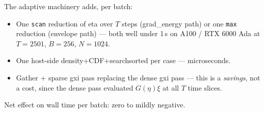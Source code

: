 \documentclass[11pt]{article}
\begin{document}
The adaptive machinery adds, per batch:

\begin{itemize}
  \item One \texttt{scan} reduction of eta over $T$ steps (grad\_energy path)
  or one \texttt{max} reduction (envelope path) --- both well under 1\,s on
  A100 / RTX 6000 Ada at $T = 2501$, $B = 256$, $N = 1024$.

  \item One host-side density+CDF+searchsorted per case --- microseconds.

  \item Gather + sparse gxi pass replacing the dense gxi pass --- this is a
  \emph{savings}, not a cost, since the dense pass evaluated $G(\eta)\xi$ at
  all $T$ time slices.
\end{itemize}

Net effect on wall time per batch: zero to mildly negative.
\end{document}
